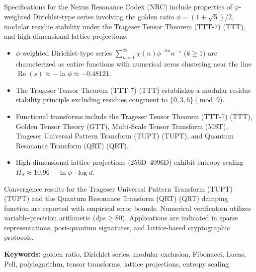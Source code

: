 \begin{abstractbox}
	Specifications for the Nexus Resonance Codex (NRC) include properties of $\varphi$-weighted Dirichlet-type series involving the golden ratio $\phi = (1 + \sqrt{5})/2$, modular residue stability under the Trageser Tensor Theorem (TTT-7) (TTT), and high-dimensional lattice projections.

	\begin{itemize}[leftmargin=*, label=\textcolor{accentorange}{\textbullet}]
		\item $\phi$-weighted Dirichlet-type series $\sum_{n=1}^\infty \chi(n) \phi^{-kn} n^{-s}$ ($k \ge 1$) are characterized as entire functions with numerical zeros clustering near the line $\operatorname{Re}(s) \approx -\ln\phi \approx -0.48121$.
		\item The Trageser Tensor Theorem (TTT-7) (TTT) establishes a modular residue stability principle excluding residues congruent to $\{0, 3, 6\} \pmod 9$.
		\item Functional transforms include the Trageser Tensor Theorem (TTT-7) (TTT), Golden Tensor Theory (GTT), Multi-Scale Tensor Transform (MST), Trageser Universal Pattern Transform (TUPT) (TUPT), and Quantum Resonance Transform (QRT) (QRT).
		\item High-dimensional lattice projections (256D--4096D) exhibit entropy scaling $H_d \approx 10.96 - \ln\phi \cdot \log d$.
	\end{itemize}
	
	Convergence results for the Trageser Universal Pattern Transform (TUPT) (TUPT) and the Quantum Resonance Transform (QRT) (QRT) damping function are reported with empirical error bounds. Numerical verification utilizes variable-precision arithmetic ($dps \ge 80$). Applications are indicated in sparse representations, post-quantum signatures, and lattice-based cryptographic protocols.

	\vspace{1em}
	\noindent\textbf{\textsf{Keywords:}} golden ratio, Dirichlet series, modular exclusion, Fibonacci, Lucas, Pell, polylogarithm, tensor transforms, lattice projections, entropy scaling
\end{abstractbox}